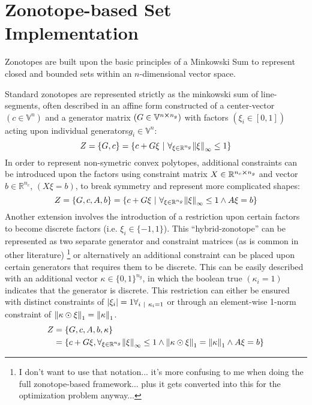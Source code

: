 \documentclass[11pt]{article}
\newcommand{\R}{\mathbb{R}} %
\newcommand{\st}{ \ | \ }
\newcommand{\V}{\mathbb{V}} %
\newcommand{\dSet}{\kappa} %
\begin{document}
\section{Zonotope-based Set Implementation}

Zonotopes are built upon the basic principles of a Minkowski Sum to represent closed and bounded sets within an $n$-dimensional vector space.

Standard zonotopes are represented strictly as the minkowski sum of line-segments, often described in an affine form constructed of a center-vector $(c \in \V^{n})$ and a generator matrix $(G \in \V^{n\cross n_g})$ with factors $(\xi_{i} \in [0,1])$ acting upon individual generators$g_{i} \in \V^{n}$:\[
	Z = \qty{G, c} = \qty{c + G \xi \st \forall_{\xi \in \R^{n_g}} \norm{\xi}_{\infty} \leq 1}
\]
In order to represent non-symetric convex polytopes, additional constraints can be introduced upon the factors using constraint matrix $X \in \R^{n_c \cross n_g}$ and vector $b \in \R^{n_c}$, $(X \xi = b)$, to break symmetry and represent more complicated shapes:\[
	Z = \qty{G, c, A, b} = \qty{c + G \xi \st \forall_{\xi \in \R^{n_g}} \norm{\xi}_{\infty} \leq 1 \land A \xi = b}
\]
Another extension involves the introduction of a restriction upon certain factors to become discrete factors (i.e. $\xi_{i} \in \{-1,1\}$).
This ``hybrid-zonotope'' can be represented as two separate generator and constraint matrices (as is common in other literature)
\footnote{
	I don't want to use that notation... 
	it's more confusing to me when doing the full zonotope-based framework... 
	plus it gets converted into this for the optimization problem anyway...
}
or alternatively an additional constraint can be placed upon certain generators that requires them to be discrete.
This can be easily described with an additional vector $\dSet \in \{0,1\}^{n_g}$, in which the boolean true $(\dSet_{i} = 1)$ indicates that the generator is discrete.
This restriction can either be ensured with distinct constraints of $\abs{\xi_{i}} = 1 \forall_{i \st \dSet_{i} = 1}$ or through an element-wise 1-norm constraint of $\norm{\dSet \odot \xi}_{1} = \norm{\dSet}_{1}$. 
\[
\begin{aligned}
	Z &= \{G,c,A,b,\dSet\} \\
		&= \qty{c + G \xi,  \forall_{\xi \in \R^{n_g}} \norm{\xi}_\infty \leq 1 \land \norm{\dSet \odot \xi}_{1} = \norm{\dSet}_{1} \land A\xi = b}
\end{aligned}
\]
\end{document}
